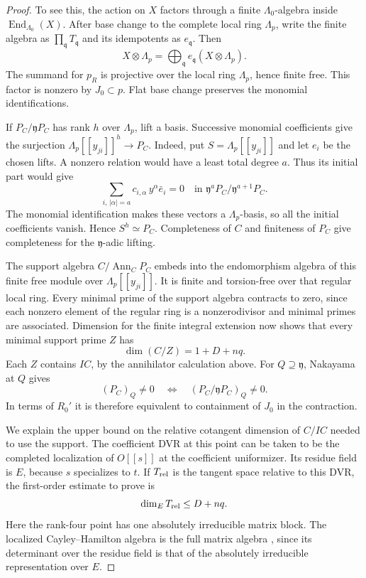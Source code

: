 \begin{proof}
To see this, the action on \(X\) factors
through a finite \(\Lambda_0\)-algebra inside
\(\operatorname{End}_{\Lambda_0}(X)\). After base change to the complete local ring \(\Lambda_p\), write the finite algebra as \(\prod_{\mathfrak q}T_{\mathfrak q}\) and its idempotents as \(e_{\mathfrak q}\). Then
\[
 X\otimes\Lambda_p=\bigoplus_{\mathfrak q} e_{\mathfrak q}(X\otimes\Lambda_p).
\]
The summand for \(p_R\) is projective over the local ring \(\Lambda_p\), hence finite free. This factor is
nonzero by \(J_0\subset p\). Flat base change preserves
the monomial identifications.

If \(P_C/\mathfrak yP_C\) has rank \(h\) over \(\Lambda_p\),
lift a basis. Successive monomial coefficients give the surjection
\(\Lambda_p[[y_{ji}]]^h\to P_C\). Indeed, put \(S=\Lambda_p[[y_{ji}]]\) and let \(e_i\) be the chosen lifts. A nonzero relation would have a least total degree \(a\). Thus its initial part would give
\[
 \sum_{i,\,|\alpha|=a} c_{i,\alpha}\,y^\alpha\bar e_i=0
 \quad\text{in }\mathfrak y^aP_C/\mathfrak y^{a+1}P_C .
\]
The monomial identification makes these vectors a \(\Lambda_p\)-basis, so all the initial coefficients vanish. Hence \(S^h\simeq P_C\). Completeness of \(C\) and finiteness
of \(P_C\) give completeness for the \(\mathfrak y\)-adic
lifting.

The support algebra \(C/\operatorname{Ann}_C P_C\)
embeds into the endomorphism algebra of this finite free
module over \(\Lambda_p[[y_{ji}]]\). It is finite and
torsion-free over that regular local ring. Every minimal
prime of the support algebra contracts to zero, since
each nonzero element of the regular ring is a
nonzerodivisor and minimal primes are associated.
Dimension for the finite integral extension now shows
that every minimal support prime \(Z\) has
\[
 \dim(C/Z)=1+D+nq .
\]
Each \(Z\) contains \(IC\), by the annihilator
calculation above. For \(Q\supseteq\mathfrak y\), Nakayama at \(Q\) gives
\[
    (P_C)_Q\ne0\quad\Longleftrightarrow\quad
                      (P_C/\mathfrak yP_C)_Q\ne0 .
\] In terms of \(R_0'\) it is
therefore equivalent to containment of \(J_0\) in
the contraction.

We explain the upper bound on the relative cotangent
dimension of \(C/IC\) needed to use the support.
The coefficient DVR at this point can be taken to be
the completed localization of \(O[[s]]\) at the
coefficient uniformizer. Its residue field is \(E\),
because \(s\) specializes to \(t\).
If \(T_{\rm rel}\) is the tangent space relative to this DVR, the first-order estimate to prove is
\[
 \dim_E T_{\rm rel}\le D+nq.
\]
Here the rank-four point has one
absolutely irreducible matrix block. The localized
Cayley--Hamilton algebra is the full matrix algebra
\cite[Theorem 2.22(i)]{chenevier}, since its determinant
over the residue field is that of the absolutely
irreducible representation over \(E\).


\end{proof}
